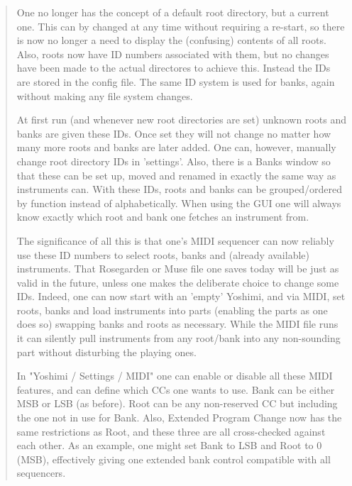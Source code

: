    \begin{quotation}
      One no longer has the concept of a default root directory, but a
      current one. This can by changed at any time without requiring a
      re-start, so there is now no longer a need to display the (confusing)
      contents of all roots.  Also, roots now have ID numbers associated
      with them, but no changes have been made to the actual directores to
      achieve this. Instead the IDs are stored in the config file. The same
      ID system is used for banks, again without making any file system
      changes.

      At first run (and whenever new root directories are set) unknown roots
      and banks are given these IDs. Once set they will not change no matter
      how many more roots and banks are later added. One can, however,
      manually change root directory IDs in 'settings'. Also, there is a
      Banks window so that these can be set up, moved and renamed in exactly
      the same way as instruments can.  With these IDs, roots and banks can
      be grouped/ordered by function instead of alphabetically. When using
      the GUI one will always know exactly which root and bank one fetches
      an instrument from.

      The significance of all this is that one's MIDI sequencer can now
      reliably use these ID numbers to select roots, banks and (already
      available) instruments. That Rosegarden or Muse file one saves
      today will be just as valid in the future, unless one makes the
      deliberate choice to change some IDs. Indeed, one can now start with
      an 'empty' Yoshimi, and via MIDI, set roots, banks and load
      instruments into parts (enabling the parts as one does so) swapping
      banks and roots as necessary. While the MIDI file runs it can silently
      pull instruments from any root/bank into any non-sounding part without
      disturbing the playing ones.

      In "Yoshimi / Settings / MIDI" one can enable or disable all these MIDI
      features, and can define which CCs one wants to use. Bank can be either
      MSB or LSB (as before). Root can be any non-reserved CC but including
      the one not in use for Bank. Also, Extended Program Change now has the
      same restrictions as Root, and these three are all cross-checked
      against each other. As an example, one might set Bank to LSB and Root
      to 0 (MSB), effectively giving one extended bank control compatible
      with all sequencers.


\end{quotation}

